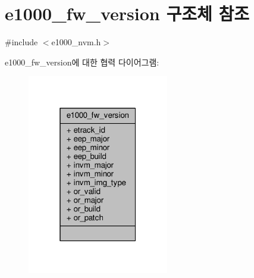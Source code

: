 \hypertarget{structe1000__fw__version}{}\section{e1000\+\_\+fw\+\_\+version 구조체 참조}
\label{structe1000__fw__version}


{\ttfamily \#include $<$e1000\+\_\+nvm.\+h$>$}



e1000\+\_\+fw\+\_\+version에 대한 협력 다이어그램\+:
\nopagebreak
\begin{figure}[H]
\begin{center}
\leavevmode
\includegraphics[width=175pt]{structe1000__fw__version__coll__graph}
\end{center}
\end{figure}
